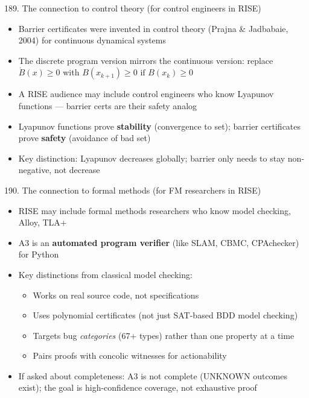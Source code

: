 \documentclass[aspectratio=169]{beamer}
\begin{document}
\begin{frame}{189. The connection to control theory (for control engineers in RISE)}
\begin{itemize}
  \item Barrier certificates were invented in control theory (Prajna \& Jadbabaie, 2004) for continuous dynamical systems
  \item The discrete program version mirrors the continuous version: replace \(\dot{B}(x) \ge 0\) with \(B(x_{k+1}) \ge 0 \text{ if } B(x_k) \ge 0\)
  \item A RISE audience may include control engineers who know Lyapunov functions --- barrier certs are their safety analog
  \item Lyapunov functions prove \textbf{stability} (convergence to set); barrier certificates prove \textbf{safety} (avoidance of bad set)
  \item Key distinction: Lyapunov decreases globally; barrier only needs to stay non-negative, not decrease
\end{itemize}
\end{frame}

\begin{frame}{190. The connection to formal methods (for FM researchers in RISE)}
\begin{itemize}
  \item RISE may include formal methods researchers who know model checking, Alloy, TLA+
  \item A3 is an \textbf{automated program verifier} (like SLAM, CBMC, CPAchecker) for Python
  \item Key distinctions from classical model checking:
    \begin{itemize}
      \item Works on real source code, not specifications
      \item Uses polynomial certificates (not just SAT-based BDD model checking)
      \item Targets bug \emph{categories} (67+ types) rather than one property at a time
      \item Pairs proofs with concolic witnesses for actionability
    \end{itemize}
  \item If asked about completeness: A3 is not complete (UNKNOWN outcomes exist); the goal is high-confidence coverage, not exhaustive proof
\end{itemize}
\end{frame}
\end{document}
